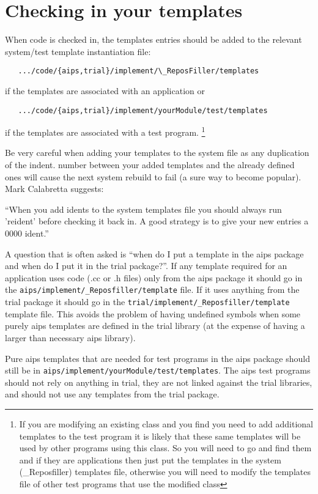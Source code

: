 \section{Checking in your templates}

When code is checked in, the templates entries should be added to the
relevant system/test template instantiation file:
\begin{verbatim}
   .../code/{aips,trial}/implement/\_ReposFiller/templates
\end{verbatim}
if the templates are associated with an application or
\begin{verbatim}
   .../code/{aips,trial}/implement/yourModule/test/templates
\end{verbatim}
if the templates are associated with a test program. \footnote{If you are
  modifying an existing class and you find you need to add additional
  templates to the test program it is likely that these same templates will
  be used by other programs using this class. So you will need to go and
  find them and if they are applications then just put the templates in the
  system (\_Reposfiller) templates file, otherwise you will need to modify
  the templates file of other test programs that use the modified class}

Be very careful when adding your templates to the system file as any
duplication of the indent. number between your added templates
and the already defined ones will cause the next system rebuild to
fail (a sure way to become popular). Mark Calabretta suggests:

``When you add idents to the system templates file you should always run
'reident' before checking it back in.  A good strategy is to give your
new entries a 0000 ident.''

A question that is often asked is ``when do I put a template in the aips
package and when do I put it in the trial package?''. If any template
required for an application uses code (.cc or .h files) only from the aips
package it should go in the \texttt{aips/implement/\_Reposfiller/template}
file. If it uses anything from the trial package it should go in the
\texttt{trial/implement/\_Reposfiller/template} template file.  This avoids
the problem of having undefined symbols when some purely aips templates are
defined in the trial library (at the expense of having a larger than
necessary aips library).

Pure aips templates that are needed for test programs in the aips package
should still be in \texttt{aips/implement/yourModule/test/templates}. The
aips test programs should not rely on anything in trial, they are not linked
against the trial libraries, and should not use any templates from the trial
package.

